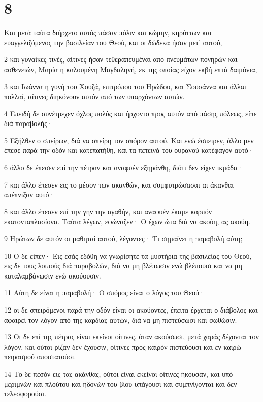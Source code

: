 \chapter{8}

\par Και μετά ταύτα διήρχετο αυτός πάσαν πόλιν και κώμην, κηρύττων και ευαγγελιζόμενος την βασιλείαν του Θεού, και οι δώδεκα ήσαν μετ' αυτού,
\par 2 και γυναίκες τινές, αίτινες ήσαν τεθεραπευμέναι από πνευμάτων πονηρών και ασθενειών, Μαρία η καλουμένη Μαγδαληνή, εκ της οποίας είχον εκβή επτά δαιμόνια,
\par 3 και Ιωάννα η γυνή του Χουζά, επιτρόπου του Ηρώδου, και Σουσάννα και άλλαι πολλαί, αίτινες διηκόνουν αυτόν από των υπαρχόντων αυτών.
\par 4 Επειδή δε συνέτρεχεν όχλος πολύς και ήρχοντο προς αυτόν από πάσης πόλεως, είπε διά παραβολής·
\par 5 Εξήλθεν ο σπείρων, διά να σπείρη τον σπόρον αυτού. Και ενώ έσπειρεν, άλλο μεν έπεσε παρά την οδόν και κατεπατήθη, και τα πετεινά του ουρανού κατέφαγον αυτό·
\par 6 άλλο δε έπεσεν επί την πέτραν και αναφυέν εξηράνθη, διότι δεν είχεν ικμάδα·
\par 7 και άλλο έπεσεν εις το μέσον των ακανθών, και συμφυτρώσασαι αι άκανθαι απέπνιξαν αυτό·
\par 8 και άλλο έπεσεν επί την γην την αγαθήν, και αναφυέν έκαμε καρπόν εκατονταπλασίονα. Ταύτα λέγων, εφώναζεν· Ο έχων ώτα διά να ακούη, ας ακούη.
\par 9 Ηρώτων δε αυτόν οι μαθηταί αυτού, λέγοντες· Τι σημαίνει η παραβολή αύτη;
\par 10 Ο δε είπεν· Εις εσάς εδόθη να γνωρίσητε τα μυστήρια της βασιλείας του Θεού, εις δε τους λοιπούς διά παραβολών, διά να μη βλέπωσιν ενώ βλέπουσι και να μη καταλαμβάνωσιν ενώ ακούουσιν.
\par 11 Αύτη δε είναι η παραβολή· Ο σπόρος είναι ο λόγος του Θεού·
\par 12 οι δε σπειρόμενοι παρά την οδόν είναι οι ακούοντες, έπειτα έρχεται ο διάβολος και αφαιρεί τον λόγον από της καρδίας αυτών, διά να μη πιστεύσωσι και σωθώσιν.
\par 13 Οι δε επί της πέτρας είναι εκείνοι οίτινες, όταν ακούσωσι, μετά χαράς δέχονται τον λόγον, και ούτοι ρίζαν δεν έχουσιν, οίτινες προς καιρόν πιστεύουσι και εν καιρώ πειρασμού αποστατούσι.
\par 14 Το δε πεσόν εις τας ακάνθας, ούτοι είναι εκείνοι οίτινες ήκουσαν, και υπό μεριμνών και πλούτου και ηδονών του βίου υπάγουσι και συμπνίγονται και δεν τελεσφορούσι.
